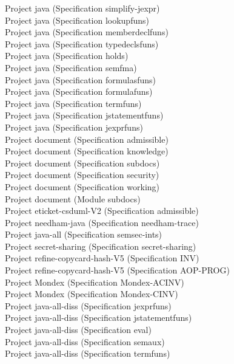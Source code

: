 \documentclass[a4paper]{article}
\begin{document}
\begin{itemize}
Project java (Specification simplify-jexpr) \\
Project java (Specification lookupfuns) \\
Project java (Specification memberdeclfuns) \\
Project java (Specification typedeclsfuns) \\
Project java (Specification holds) \\
Project java (Specification semfma) \\
Project java (Specification formulasfuns) \\
Project java (Specification formulafuns) \\
Project java (Specification termfuns) \\
Project java (Specification jstatementfuns) \\
Project java (Specification jexprfuns) \\
Project document (Specification admissible) \\
Project document (Specification knowledge) \\
Project document (Specification subdocs) \\
Project document (Specification security) \\
Project document (Specification working) \\
Project document (Module subdocs) \\
Project eticket-csduml-V2 (Specification admissible) \\
Project needham-java (Specification needham-trace) \\
Project java-all (Specification semsec-ints) \\
Project secret-sharing (Specification secret-sharing) \\
Project refine-copycard-hash-V5 (Specification INV) \\
Project refine-copycard-hash-V5 (Specification AOP-PROG) \\
Project Mondex (Specification Mondex-ACINV) \\
Project Mondex (Specification Mondex-CINV) \\
Project java-all-diss (Specification jexprfuns) \\
Project java-all-diss (Specification jstatementfuns) \\
Project java-all-diss (Specification eval) \\
Project java-all-diss (Specification semaux) \\
Project java-all-diss (Specification termfuns) \\

\end{itemize}
\end{document}
